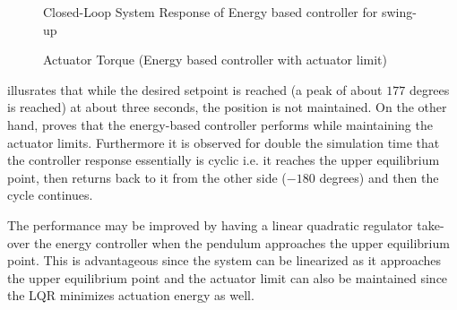 \begin{figure}[h!]
	\centering
	\caption{Closed-Loop System Response of Energy based controller for swing-up}
	\label{fig:resEnergy}
\end{figure}
\begin{figure}[h!]
	\centering
	\caption{Actuator Torque (Energy based controller with actuator limit)}
	\label{fig:actEnergy}
\end{figure}
 illusrates that while the desired setpoint is reached (a peak of about $177$ degrees is reached) at about three seconds, the position is not maintained. On the other hand,  proves that the energy-based controller performs while maintaining the actuator limits. Furthermore it is observed for double the simulation time that the controller response essentially is cyclic i.e. it reaches the upper equilibrium point, then returns back to it from the other side ($-180$ degrees) and then the cycle continues. 

The performance may be improved by having a linear quadratic regulator take-over the energy controller when the pendulum approaches the upper equilibrium point. This is advantageous since the system can be linearized as it approaches the upper equilibrium point and the actuator limit can also be maintained since the LQR minimizes actuation energy as well.
